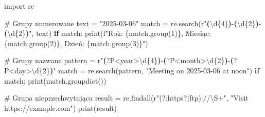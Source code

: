 \documentclass[
  polish,
  letterpaper,
  DIV=11,
  numbers=noendperiod]{scrreprt}
\newenvironment{Shaded}{\begin{snugshade}}{\end{snugshade}}
\newcommand{\BuiltInTok}[1]{\textcolor[rgb]{0.00,0.23,0.31}{#1}}
\newcommand{\CommentTok}[1]{\textcolor[rgb]{0.37,0.37,0.37}{#1}}
\newcommand{\ControlFlowTok}[1]{\textcolor[rgb]{0.00,0.23,0.31}{\textbf{#1}}}
\newcommand{\DecValTok}[1]{\textcolor[rgb]{0.68,0.00,0.00}{#1}}
\newcommand{\FunctionTok}[1]{\textcolor[rgb]{0.28,0.35,0.67}{#1}}
\newcommand{\ImportTok}[1]{\textcolor[rgb]{0.00,0.46,0.62}{#1}}
\newcommand{\KeywordTok}[1]{\textcolor[rgb]{0.00,0.23,0.31}{\textbf{#1}}}
\newcommand{\NormalTok}[1]{\textcolor[rgb]{0.00,0.23,0.31}{#1}}
\newcommand{\OperatorTok}[1]{\textcolor[rgb]{0.37,0.37,0.37}{#1}}
\newcommand{\SpecialCharTok}[1]{\textcolor[rgb]{0.37,0.37,0.37}{#1}}
\newcommand{\SpecialStringTok}[1]{\textcolor[rgb]{0.13,0.47,0.30}{#1}}
\newcommand{\StringTok}[1]{\textcolor[rgb]{0.13,0.47,0.30}{#1}}
\newcommand{\VerbatimStringTok}[1]{\textcolor[rgb]{0.13,0.47,0.30}{#1}}
\begin{document}
\begin{Shaded}
\begin{Highlighting}[]
\ImportTok{import}\NormalTok{ re}

\CommentTok{\# Grupy numerowane}
\NormalTok{text }\OperatorTok{=} \StringTok{"2025{-}03{-}06"}
\NormalTok{match }\OperatorTok{=}\NormalTok{ re.search(}\VerbatimStringTok{r"}\KeywordTok{(}\DecValTok{\textbackslash{}d}\OperatorTok{\{4\}}\KeywordTok{)}\VerbatimStringTok{{-}}\KeywordTok{(}\DecValTok{\textbackslash{}d}\OperatorTok{\{2\}}\KeywordTok{)}\VerbatimStringTok{{-}}\KeywordTok{(}\DecValTok{\textbackslash{}d}\OperatorTok{\{2\}}\KeywordTok{)}\VerbatimStringTok{"}\NormalTok{, text)}
\ControlFlowTok{if}\NormalTok{ match:}
    \BuiltInTok{print}\NormalTok{(}\SpecialStringTok{f"Rok: }\SpecialCharTok{\{}\NormalTok{match}\SpecialCharTok{.}\NormalTok{group(}\DecValTok{1}\NormalTok{)}\SpecialCharTok{\}}\SpecialStringTok{, Miesiąc: }\SpecialCharTok{\{}\NormalTok{match}\SpecialCharTok{.}\NormalTok{group(}\DecValTok{2}\NormalTok{)}\SpecialCharTok{\}}\SpecialStringTok{, Dzień: }\SpecialCharTok{\{}\NormalTok{match}\SpecialCharTok{.}\NormalTok{group(}\DecValTok{3}\NormalTok{)}\SpecialCharTok{\}}\SpecialStringTok{"}\NormalTok{)}

\CommentTok{\# Grupy nazwane}
\NormalTok{pattern }\OperatorTok{=} \VerbatimStringTok{r"}\KeywordTok{(}\FunctionTok{?P\textless{}year\textgreater{}}\DecValTok{\textbackslash{}d}\OperatorTok{\{4\}}\KeywordTok{)}\VerbatimStringTok{{-}}\KeywordTok{(}\FunctionTok{?P\textless{}month\textgreater{}}\DecValTok{\textbackslash{}d}\OperatorTok{\{2\}}\KeywordTok{)}\VerbatimStringTok{{-}}\KeywordTok{(}\FunctionTok{?P\textless{}day\textgreater{}}\DecValTok{\textbackslash{}d}\OperatorTok{\{2\}}\KeywordTok{)}\VerbatimStringTok{"}
\NormalTok{match }\OperatorTok{=}\NormalTok{ re.search(pattern, }\StringTok{"Meeting on 2025{-}03{-}06 at noon"}\NormalTok{)}
\ControlFlowTok{if}\NormalTok{ match:}
    \BuiltInTok{print}\NormalTok{(match.groupdict())}

\CommentTok{\# Grupa nieprzechwytująca}
\NormalTok{result }\OperatorTok{=}\NormalTok{ re.findall(}\VerbatimStringTok{r"}\NormalTok{(?:}\VerbatimStringTok{https}\OperatorTok{?}\ControlFlowTok{|}\VerbatimStringTok{ftp}\NormalTok{)}\VerbatimStringTok{://}\DecValTok{\textbackslash{}S}\OperatorTok{+}\VerbatimStringTok{"}\NormalTok{, }\StringTok{"Visit https://example.com"}\NormalTok{)}
\BuiltInTok{print}\NormalTok{(result)}
\end{Highlighting}
\end{Shaded}
\end{document}
